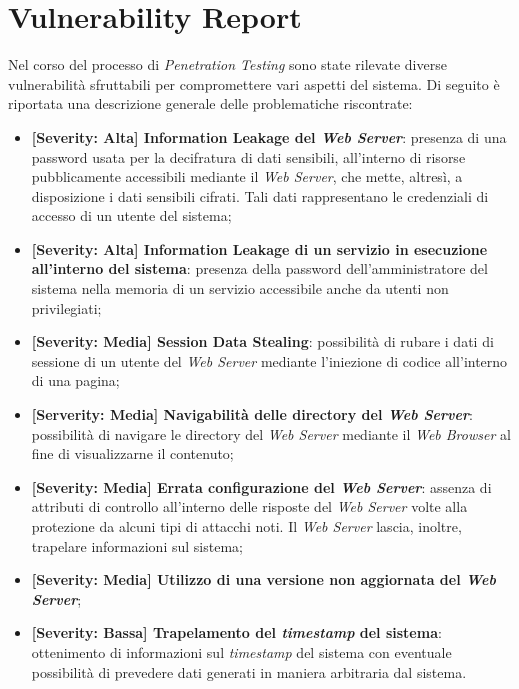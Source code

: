 \documentclass[a4paper,11pt,oneside,top=3cm,bottom=3cm,left=3.5cm,right=3.5cm,openright,reqno,table]{book}
\begin{document}
\section{Vulnerability Report}
Nel corso del processo di \emph{Penetration Testing} sono state rilevate diverse vulnerabilità sfruttabili per compromettere vari aspetti del sistema. Di seguito è riportata una descrizione generale delle problematiche riscontrate:
\begin{itemize}
    \item \textbf{[Severity: Alta] Information Leakage del \emph{Web Server}}: presenza di una password usata per la decifratura di dati sensibili, all'interno di risorse pubblicamente accessibili mediante il \emph{Web Server}, che mette, altresì, a disposizione i dati sensibili cifrati. Tali dati rappresentano le credenziali di accesso di un utente del sistema;
    \item \textbf{[Severity: Alta] Information Leakage di un servizio in esecuzione all'interno del sistema}: presenza della password dell'amministratore del sistema nella memoria di un servizio accessibile anche da utenti non privilegiati;
    \item \textbf{[Severity: Media] Session Data Stealing}: possibilità di rubare i dati di sessione di un utente del \emph{Web Server} mediante l'iniezione di codice all'interno di una pagina;
    \item \textbf{[Serverity: Media] Navigabilità delle directory del \emph{Web Server}}: possibilità di navigare le directory del \emph{Web Server} mediante il \emph{Web Browser} al fine di visualizzarne il contenuto;
    \item \textbf{[Severity: Media] Errata configurazione del \emph{Web Server}}: assenza di attributi di controllo all'interno delle risposte del \emph{Web Server} volte alla protezione da alcuni tipi di attacchi noti. Il \emph{Web Server} lascia, inoltre, trapelare informazioni sul sistema;
    \item \textbf{[Severity: Media] Utilizzo di una versione non aggiornata del \emph{Web Server}};
    \item \textbf{[Severity: Bassa] Trapelamento del \emph{timestamp} del sistema}: ottenimento di informazioni sul \emph{timestamp} del sistema con eventuale possibilità di prevedere dati generati in maniera arbitraria dal sistema.
\end{itemize}
\end{document}
